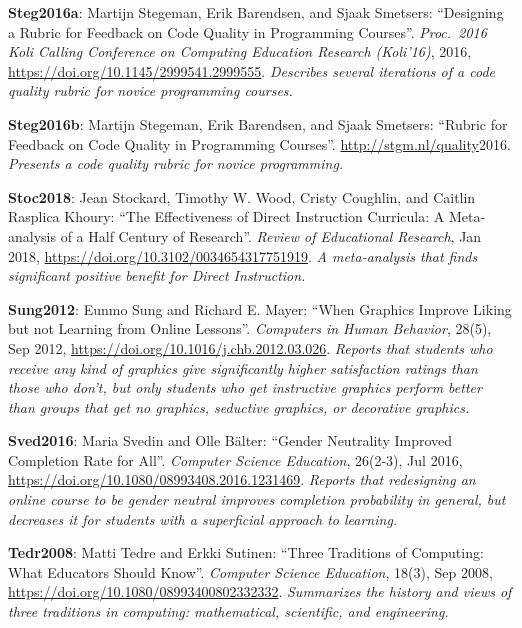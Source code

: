 \textbf{\hypertarget{b:Steg2016a}{Steg2016a}\label{b:Steg2016a}}: Martijn Stegeman, Erik Barendsen, and Sjaak Smetsers: ``Designing a Rubric for Feedback on Code Quality in Programming Courses''. \emph{Proc.\ 2016 Koli Calling Conference on Computing Education Research (Koli'16)}, 2016, \url{https://doi.org/10.1145/2999541.2999555}. \emph{Describes several iterations of a code quality rubric for novice programming courses.}

\textbf{\hypertarget{b:Steg2016b}{Steg2016b}\label{b:Steg2016b}}: Martijn Stegeman, Erik Barendsen, and Sjaak Smetsers: ``Rubric for Feedback on Code Quality in Programming Courses''. \url{http://stgm.nl/quality}2016. \emph{Presents a code quality rubric for novice programming.}

\textbf{\hypertarget{b:Stoc2018}{Stoc2018}\label{b:Stoc2018}}: Jean Stockard, Timothy W. Wood, Cristy Coughlin, and Caitlin Rasplica Khoury: ``The Effectiveness of Direct Instruction Curricula: A Meta-analysis of a Half Century of Research''. \emph{Review of Educational Research}, Jan 2018, \url{https://doi.org/10.3102/0034654317751919}. \emph{A meta-analysis that finds significant positive benefit for Direct Instruction.}

\textbf{\hypertarget{b:Sung2012}{Sung2012}\label{b:Sung2012}}: Eunmo Sung and Richard E. Mayer: ``When Graphics Improve Liking but not Learning from Online Lessons''. \emph{Computers in Human Behavior}, 28(5), Sep 2012, \url{https://doi.org/10.1016/j.chb.2012.03.026}. \emph{Reports that students who receive any kind of graphics give significantly higher satisfaction ratings than those who don't, but only students who get instructive graphics perform better than groups that get no graphics, seductive graphics, or decorative graphics.}

\textbf{\hypertarget{b:Sved2016}{Sved2016}\label{b:Sved2016}}: Maria Svedin and Olle Bälter: ``Gender Neutrality Improved Completion Rate for All''. \emph{Computer Science Education}, 26(2-3), Jul 2016, \url{https://doi.org/10.1080/08993408.2016.1231469}. \emph{Reports that redesigning an online course to be gender neutral improves completion probability in general, but decreases it for students with a superficial approach to learning.}

\textbf{\hypertarget{b:Tedr2008}{Tedr2008}\label{b:Tedr2008}}: Matti Tedre and Erkki Sutinen: ``Three Traditions of Computing: What Educators Should Know''. \emph{Computer Science Education}, 18(3), Sep 2008, \url{https://doi.org/10.1080/08993400802332332}. \emph{Summarizes the history and views of three traditions in computing: mathematical, scientific, and engineering.}

